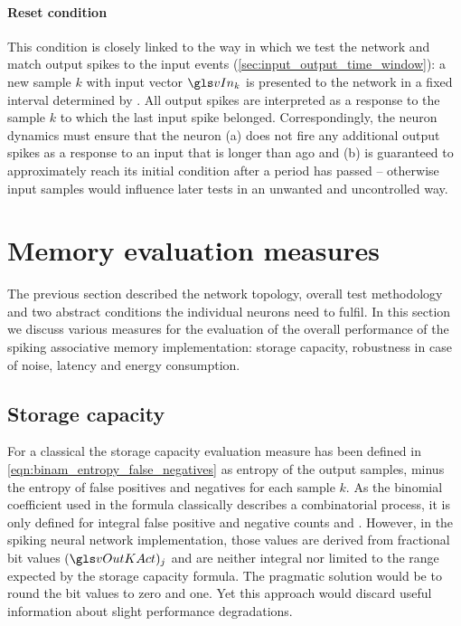 \paragraph{Reset condition}
This condition is closely linked to the way in which we test the network and match output spikes to the input events (\cref{sec:input_output_time_window}): a new sample $k$ with input vector $\vIn_k$ is presented to the network in a fixed interval determined by \timeWindow. All output spikes are interpreted as a response to the sample $k$ to which the last input spike belonged. Correspondingly, the neuron dynamics must ensure that the neuron (a) does not fire any additional output spikes as a response to an input that is longer than \timeWindow ago and (b) is guaranteed to approximately reach its initial condition after a period \timeWindow has passed -- otherwise input samples would influence later tests in an unwanted and uncontrolled way.

\section{Memory evaluation measures}
\label{sec:memory_evaluation_measures}

The previous section described the network topology, overall test methodology and two abstract conditions the individual neurons need to fulfil. In this section we discuss various measures for the evaluation of the overall performance of the spiking associative memory implementation: storage capacity, robustness in case of noise, latency and energy consumption.

\subsection{Storage capacity}
\label{sec:eval_storage_capacity}

For a classical \BiNAM the storage capacity evaluation measure has been defined in \vref{eqn:binam_entropy_false_negatives} as entropy of the output samples, minus the entropy of false positives and negatives for each sample $k$. As the binomial coefficient used in the formula classically describes a combinatorial process, it is only defined for integral false positive and negative counts \nFPk and \nFNk. However, in the spiking neural network implementation, those values are derived from fractional bit values \((\vOutKAct)_j\) and are neither integral nor limited to the range expected by the storage capacity formula. The pragmatic solution would be to round the bit values to zero and one. Yet this approach would discard useful information about slight performance degradations.

